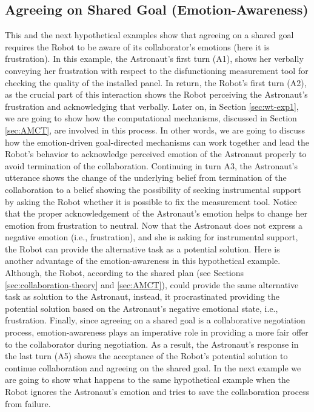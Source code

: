 \subsection{Agreeing on Shared Goal (Emotion-Awareness)}
\label{sec:exp1}

This and the next hypothetical examples show that agreeing on a shared goal
requires the Robot to be aware of its collaborator's emotions (here it is
frustration). In this example, the Astronaut's first turn (A1), shows her
verbally conveying her frustration with respect to the disfunctioning
measurement tool for checking the quality of the installed panel. In return, the
Robot's first turn (A2), as the crucial part of this interaction shows the Robot
perceiving the Astronaut's frustration and acknowledging that verbally. Later
on, in Section \ref{sec:wt-exp1}, we are going to show how the computational
mechanisms, discussed in Section \ref{sec:AMCT}, are involved in this process.
In other words, we are going to discuss how the emotion-driven goal-directed
mechanisms can work together and lead the Robot's behavior to acknowledge
perceived emotion of the Astronaut properly to avoid termination of the
collaboration. Continuing in turn A3, the Astronaut's utterance shows the change
of the underlying belief from termination of the collaboration to a belief
showing the possibility of seeking instrumental support by asking the Robot
whether it is possible to fix the measurement tool. Notice that the proper
acknowledgement of the Astronaut's emotion helps to change her emotion from
frustration to neutral. Now that the Astronaut does not express a negative
emotion (i.e., frustration), and she is asking for instrumental support, the
Robot can provide the alternative task as a potential solution. Here is another
advantage of the emotion-awareness in this hypothetical example. Although, the
Robot, according to the shared plan (see Sections \ref{sec:collaboration-theory}
and \ref{sec:AMCT}), could provide the same alternative task as solution to the
Astronaut, instead, it procrastinated providing the potential solution based on
the Astronaut's negative emotional state, i.e., frustration. Finally, since
agreeing on a shared goal is a collaborative negotiation process,
emotion-awareness plays an imperative role in providing a more fair offer to the
collaborator during negotiation. As a result, the Astronaut's response in the
last turn (A5) shows the acceptance of the Robot's potential solution to
continue collaboration and agreeing on the shared goal. In the next example we
are going to show what happens to the same hypothetical example when the Robot
ignores the Astronaut's emotion and tries to save the collaboration process from
failure.\\

